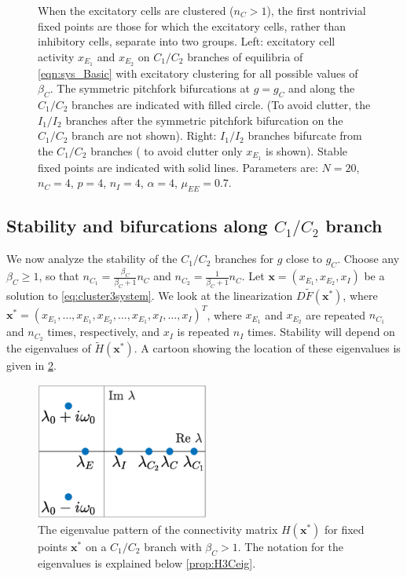 \documentclass[reqno]{siamonline190516}
\newcommand{\xvec}{\mathbf{x}}
\begin{document}
\begin{figure}
    \caption{When the excitatory cells are clustered ($n_C>1$), the first nontrivial fixed points are those for which the excitatory cells, rather than inhibitory cells, separate into two groups. Left: excitatory cell activity $x_{E_1}$ and $x_{E_2}$ on $C_1/C_2$ branches of equilibria of \cref{eqn:sys_Basic} with excitatory clustering for all possible values of $\beta_C$. The symmetric pitchfork bifurcations at $g = g_C$ and along the $C_1/C_2$ branches are indicated with filled circle. (To avoid clutter, the $I_1/I_2$ branches after the symmetric pitchfork bifurcation on the $C_1/C_2$ branch are not shown). Right: $I_1/I_2$ branches bifurcate from the $C_1/C_2$ branches ( to avoid clutter only $x_{E_1}$ is shown). Stable fixed points are indicated with solid lines. Parameters are: $N = 20$, $n_C = 4$, $p = 4$, $n_I = 4$, $\alpha = 4$, $\mu_{EE} = 0.7$.}
    \label{fig:clusterBD1}
\end{figure}

\subsection{Stability and bifurcations along \texorpdfstring{$C_1/C_2$}{C1/C2} branch}\label{sec:C1C2stability}

We now analyze the stability of the $C_1/C_2$ branches for $g$ close to $g_C$. Choose any $\beta_C \geq 1$, so that $n_{C_1} = \frac{\beta_C}{\beta_C+1}n_C$ and $n_{C_2} = \frac{1}{\beta_C+1}n_C$. Let $\xvec = (x_{E_1}, x_{E_2}, x_{I})$ be a solution to \cref{eq:cluster3system}. We look at the linearization $D\tilde{F}(\xvec^*)$, where $\xvec^* = (x_{E_1}, \dots, x_{E_1}, x_{E_2}, \dots, x_{E_1}, x_{I}, \dots, x_{I})^T$, where $x_{E_1}$ and $x_{E_2}$ are repeated $n_{C_1}$ and $n_{C_2}$ times, respectively, and $x_I$ is repeated $n_I$ times. Stability will depend on the eigenvalues of $\tilde{H}(\xvec^*)$. A cartoon showing the location of these eigenvalues is given in \cref{fig:HstareigEcluster}. 

\begin{figure}
    \centering
    \includegraphics[width=5.7cm]{eigpatternxstarEcluster.eps}
    \caption{The eigenvalue pattern of the connectivity matrix $H(\xvec^*)$ for fixed points $\xvec^*$ on a $C_1/C_2$ branch with $\beta_C > 1$. The notation for the eigenvalues is explained below \cref{prop:H3Ceig}.}
    \label{fig:HstareigEcluster}
\end{figure}
\end{document}
